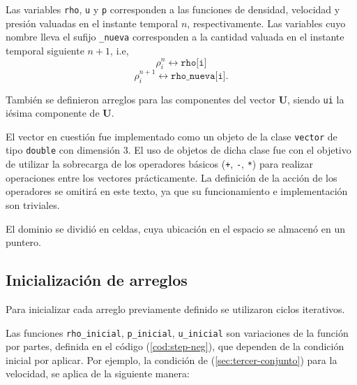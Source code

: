 Las variables \texttt{rho}, \texttt{u} y \texttt{p} corresponden a las funciones de densidad, velocidad y presión valuadas en el instante temporal $n$, respectivamente. Las variables cuyo nombre lleva el sufijo \texttt{\_nueva} corresponden a la cantidad valuada en el instante temporal siguiente $n+1$, i.e,
\begin{equation}
	\rho_{i}^{n} \leftrightarrow \texttt{rho[i]}
\end{equation}
\begin{equation}
	\rho_{i}^{n+1} \leftrightarrow \texttt{rho\_nueva[i]}.
\end{equation}

También se definieron arreglos para las componentes del vector $\mathbf{{U}}$, siendo \texttt{ui} la iésima componente de $\mathbf{{U}}$.


El vector en cuestión fue implementado como un objeto de la clase \texttt{vector} de tipo \texttt{double} con dimensión 3. El uso de objetos de dicha clase fue con el objetivo de utilizar la sobrecarga de los operadores básicos (\texttt{+}, \texttt{-}, \texttt{*}) para realizar operaciones entre los vectores prácticamente. La definición de la acción de los operadores se omitirá en este texto, ya que su funcionamiento e implementación son triviales. 


El dominio se dividió en celdas, cuya ubicación en el espacio se almacenó en un puntero.

\subsection{Inicialización de arreglos}
Para inicializar cada arreglo previamente definido se utilizaron ciclos iterativos.


Las funciones \texttt{rho\_inicial}, \texttt{p\_inicial}, \texttt{u\_inicial} son variaciones de la función por partes, definida en el código (\ref{cod:step-neg}), que dependen de la condición inicial por aplicar. Por ejemplo, la condición de (\ref{sec:tercer-conjunto}) para la velocidad, se aplica de la siguiente manera:


